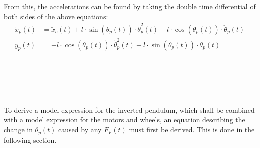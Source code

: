 From this, the accelerations can be found by taking the double time differential of both sides of the above equations:
\begin{align}
\ddot x_p(t) &= \ddot x_c(t) + l \cdot \sin(\theta_p(t))\cdot \dot\theta_p^2 (t) - l \cdot \cos(\theta_p(t))\cdot \ddot\theta_p(t) \label{eq_acc_x}\\
\ddot y_p(t) &= -l\cdot \cos(\theta_p(t)) \cdot \dot\theta_p^2 (t) - l \cdot \sin(\theta_p(t))\cdot \ddot\theta_p (t)\label{eq_acc_y}
\end{align}
\begin{where}
\\
\\
\\
\\
\end{where}

To derive a model expression for the inverted pendulum, which shall be combined with a model expression for the motors and wheels, an equation %
 describing the change in $\theta_p(t)$ caused by any $F_F(t)$ must first be derived. This is done in the following section.
